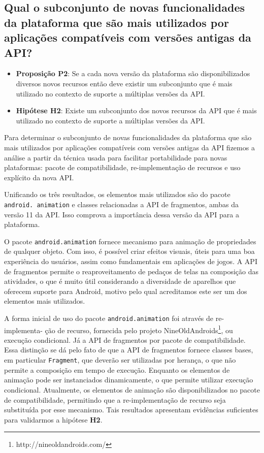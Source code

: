\subsection{Qual o subconjunto de novas funcionalidades da plataforma que são mais
utilizados por aplicações compatíveis com versões antigas da API?} \label{subsec:mudancas}

\begin{itemize}
	\item \textbf{Proposição P2}: Se a cada nova versão da plataforma são disponibilizados
	diversos novos recursos então deve existir um subconjunto que é mais utilizado no 
	contexto de suporte a múltiplas versões da API.
	\item \textbf{Hipótese H2}: Existe um subconjunto dos novos recursos da API que é
	mais utilizado no contexto de suporte a múltiplas versões da API.
\end{itemize}

Para determinar o subconjunto de novas funcionalidades da plataforma que são mais
utilizados por aplicações compatíveis com versões antigas da API fizemos a análise
a partir da técnica usada para facilitar portabilidade para novas plataformas: pacote
de compatibilidade, re-implementação de recursos e uso explícito da nova API.

Unificando os três resultados,  os elementos mais utilizados são do pacote
\texttt{android. animation} e classes relacionadas a API de fragmentos, ambas
da versão 11 da API. Isso comprova a importância dessa versão da API para a
plataforma. 

O pacote \texttt{android.animation} fornece mecanismo para animação de propriedades
de qualquer objeto. Com isso, é possível criar efeitos visuais, úteis para uma boa
experiência do usuários, assim como fundamentais em aplicações de jogos. A API de
fragmentos permite o reaproveitamento de pedaços de telas na composição das atividades,
o que é muito útil considerando a diversidade de aparelhos que oferecem suporte para
Android, motivo pelo qual acreditamos este ser um dos elementos mais utilizados. 

A forma inicial de uso do pacote \texttt{android.animation} foi através de
re-implementa- ção de recurso, fornecida pelo projeto NineOldAndroids\footnote{http://nineoldandroids.com/},
ou execução condicional. Já a API de fragmentos por pacote de compatibilidade.
Essa distinção se dá pelo fato de que a API de fragmentos fornece classes bases,
em particular \texttt{Fragment}, que deverão ser utilizadas por herança, o que não
permite a composição em tempo de execução. Enquanto os elementos de animação pode
ser instanciados dinamicamente, o que permite utilizar execução condicional.
Atualmente, os elementos de animação são disponibilizados no pacote de compatibilidade,
permitindo que a re-implementação de recurso seja substituída por esse mecanismo.
Tais resultados apresentam evidências suficientes para validarmos a hipótese \textbf{H2}.

